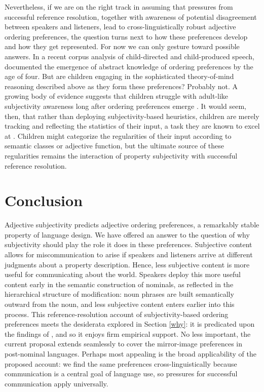 \documentclass{sp}
\newcommand{\gcs}[1]{\textcolor{blue}{[gcs: #1]}}
\begin{document}
Nevertheless, if we are on the right track in assuming that pressures from successful reference resolution, together with awareness of potential disagreement between speakers and listeners, lead to cross-linguistically robust adjective ordering preferences, the question turns next to how these preferences develop and how they get represented. For now we can only gesture toward possible answers. In a recent corpus analysis of child-directed and child-produced speech, \cite{barseveretal2017} documented the emergence of abstract knowledge of ordering preferences by the age of four. But are children engaging in the sophisticated theory-of-mind reasoning described above as they form these preferences? Probably not. A growing body of evidence suggests that children struggle with adult-like subjectivity awareness long after ordering preferences emerge \citep{fousheesrinivasan2017}. It would seem, then, that rather than deploying subjectivity-based heuristics, children are merely tracking and reflecting the statistics of their input, a task they are known to excel at \citep[e.g.,][]{saffranetal1996}. Children might categorize the regularities of their input according to semantic classes or adjective function, but the ultimate source of these regularities remains the interaction of property subjectivity with successful reference resolution. %






\section{Conclusion} \label{conclusion}

Adjective subjectivity predicts adjective ordering preferences, a remarkably stable property of language design. We have offered an answer to the question of why subjectivity should play the role it does in these preferences. Subjective content allows for miscommunication to arise if speakers and listeners arrive at different judgments about a property description. Hence, less subjective content is more useful for communicating about the world. Speakers deploy this more useful content early in the semantic construction of nominals, as reflected in the hierarchical structure of modification: noun phrases are built semantically outward from the noun, and less subjective content enters earlier into this process. This reference-resolution account of subjectivity-based ordering preferences meets the desiderata explored in Section \ref{why}: it is predicated upon the findings of \cite{scontrasetal2017adjectives}, and so it enjoys firm empirical support. No less important, the current proposal extends seamlessly to cover the mirror-image preferences in post-nominal languages. Perhaps most appealing is the broad applicability of the proposed account: we find the same preferences cross-linguistically because communication is a central goal of language use, so pressures for successful communication apply universally.
\end{document}
